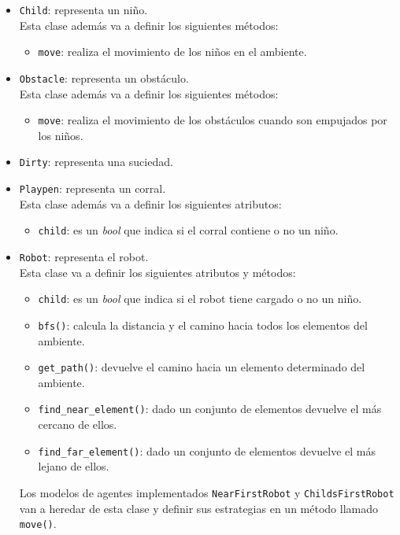 \documentclass[12pt,a4paper]{article}
\begin{document}
	\begin{itemize}
		\item \texttt{Child}: representa un ni\~no.\\
		Esta clase adem\'as va a definir los siguientes m\'etodos:
		 \begin{itemize}
		 	\item \texttt{move}: realiza el movimiento de los ni\~nos en el ambiente.
		 \end{itemize}
		\item \texttt{Obstacle}: representa un obst\'aculo.\\
		Esta clase adem\'as va a definir los siguientes m\'etodos:
		\begin{itemize}
			\item \texttt{move}: realiza el movimiento de los obst\'aculos cuando son empujados por los ni\~nos.
		\end{itemize}
		\item \texttt{Dirty}: representa una suciedad.
		\item \texttt{Playpen}: representa un corral.\\
		Esta clase adem\'as va a definir los siguientes atributos:
		\begin{itemize}
			\item \texttt{child}: es un  \textit{bool} que indica si el corral contiene o no un ni\~no.
		\end{itemize}
		\item \texttt{Robot}: representa el robot. \\
		Esta clase va a definir los siguientes atributos y m\'etodos:
		\begin{itemize}
			\item \texttt{child}: es un  \textit{bool} que indica si el robot tiene cargado o no un ni\~no.
			\item \texttt{bfs()}: calcula la distancia y el camino hacia todos los elementos del ambiente.
			\item \texttt{get\_path()}: devuelve el camino hacia un elemento determinado del ambiente.
			\item \texttt{find\_near\_element()}: dado un conjunto de elementos devuelve el m\'as cercano de ellos. 
			\item \texttt{find\_far\_element()}: dado un conjunto de elementos devuelve el m\'as lejano de ellos. 
		\end{itemize}
		Los modelos de agentes implementados \texttt{NearFirstRobot} y \texttt{ChildsFirstRobot} van a heredar de esta clase y definir sus estrategias en un m\'etodo llamado \texttt{move()}. 
	\end{itemize}
	
\end{document}
